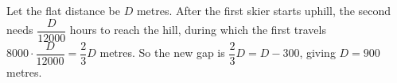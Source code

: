 Let the flat distance be $D$ metres. After the first skier starts uphill, the second needs $\dfrac{D}{12000}$ hours to reach the hill, during which the first travels $8000\cdot\dfrac{D}{12000}=\dfrac23D$ metres. So the new gap is $\dfrac23D=D-300$, giving $D=\boxed{900}$ metres.
